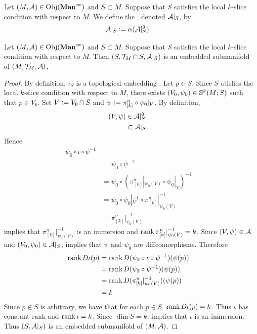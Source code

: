 \documentclass{book}
\begin{document}
	\begin{defn} 
			Let $(M, \MA) \in \Obj(\bManinf)$ and $S \subset M$. Suppose that $S$ satisfies the local $k$-slice condition with respect to $M$. We define the , denoted $\MA|_S$, by 
			$$\MA|_S \defeq \al(\MA|_S^0).$$
	\end{defn}
	
	\begin{ex} 
		Let $(M, \MA) \in \Obj(\bManinf)$ and $S \subset M$. Suppose that $S$ satisfies the local $k$-slice condition with respect to $M$. Then $(S, \MT_M \cap S, \MA|_S)$ is an embedded submanifold of $(M, \MT_M, \MA)$,
	\end{ex}

	\begin{proof} 
		By definition, $\iota_S$ is a topological embedding . Let $p \in S$. Since $S$ atisfies the local $k$-slice condition with respect to $M$, there exists $(V_0, \psi_0) \in \S^k(M; S)$ such that $p \in V_0$. Set $V \defeq V_0 \cap S$ and $\psi \defeq \pi^n_{[k]} \circ \psi_0|_V$. By definition,  
		\begin{align*}
			(V, \psi) 
			& \in \MA|_S^0 \\
			& \subset \MA|_S.
		\end{align*}
		Hence 
		\begin{align*}
			\psi_0 \circ \iota \circ \psi^{-1} \\
			& = \psi_0 \circ \psi^{-1} \\
			& = \psi_0 \circ (\pi^n_{[k]}|_{\psi_0(V)} \circ \psi_0|_V)^{-1} \\
			& = \psi_0 \circ \psi_0|_V^{-1} \circ \pi^n_{[k]}|_{\psi_0(V)}^{-1} \\
			& = \pi^n_{[k]}|_{\psi_0(V)}^{-1} 
		\end{align*}
		 implies that $\pi^n_{[k]}|_{\psi_0(V)}^{-1}$ is an immersion and $\rnk \pi^n_{[k]}|_{\psi_0(V)}^{-1} = k$. Since $(V, \psi) \in \MA$ and $(V_0, \psi_0) \in \MA|_S$,  implies that $\psi$ and $\psi_0$ are diffeomorphisms. Therefore
		\begin{align*}
			\rnk D \iota (p)
			& = \rnk D (\psi_0 \circ \iota \circ \psi^{-1})(\psi(p)) \\
			& = \rnk D (\psi_0 \circ \psi^{-1})(\psi(p)) \\
			& = \rnk D (\pi^n_{[k]}|_{\psi_0(V)}^{-1})(\psi(p)) \\
			& = k
		\end{align*}  
		Since $p \in S$ is arbitrary, we have that for each $p \in S$, $\rnk D \iota (p) = k$. Thus $\iota$ has constant rank and $\rnk \iota = k$. Since $\dim S = k$,  implies that $\iota$ is an immersion. Thus $(S, \MA|_S)$ is an embedded submanifold of $(M, \MA)$.
	\end{proof}
	
\end{document}
